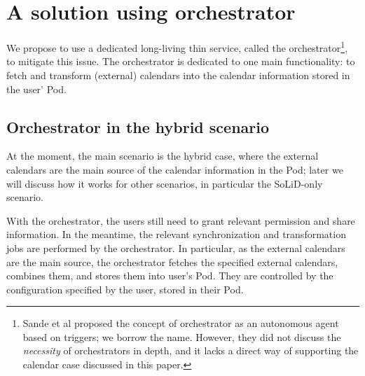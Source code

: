 \documentclass[
twocolumn,
]{ceurart}
\begin{document}

\section{A solution using orchestrator}

We propose to use a dedicated long-living thin service, called the orchestrator\footnote{Sande et al proposed the concept of orchestrator as an autonomous agent based on triggers; we borrow the name. However, they did not discuss the \emph{necessity} of orchestrators in depth, and it lacks a direct way of supporting the calendar case discussed in this paper.}, to mitigate this issue.
The orchestrator is dedicated to one main functionality: to fetch and transform (external) calendars into the calendar information stored in the user' Pod.

\subsection{Orchestrator in the hybrid scenario}

At the moment, the main scenario is the hybrid case, where the external calendars are the main source of the calendar information in the Pod; later we will discuss how it works for other scenarios, in particular the SoLiD-only scenario.

With the orchestrator, the users still need to grant relevant permission and share information. In the meantime, the relevant synchronization and transformation jobs are performed by the orchestrator.
In particular, as the external calendars are the main source, the orchestrator fetches the specified external calendars, combines them, and stores them into user's Pod. They are controlled by the configuration specified by the user, stored in their Pod.
\end{document}
